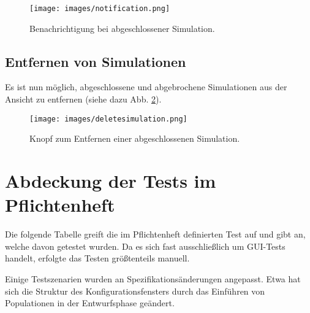 \documentclass[parskip=full,11pt,openany]{scrreprt}
\begin{document}
\begin{figure}
	\centering
	\texttt{[image: images/notification.png]}
	\caption{Benachrichtigung bei abgeschlossener Simulation.}
	\label{notification}
\end{figure}

\subsection{Entfernen von Simulationen}
Es ist nun möglich, abgeschlossene und abgebrochene Simulationen aus der Ansicht zu entfernen (siehe dazu Abb. \ref{deletesimulation}).

\begin{figure}
	\centering
	\texttt{[image: images/deletesimulation.png]}
	\caption{Knopf zum Entfernen einer abgeschlossenen Simulation.}
	\label{deletesimulation}
\end{figure}

\section{Abdeckung der Tests im Pflichtenheft}

Die folgende Tabelle greift die im Pflichtenheft definierten Test auf und gibt an, welche davon getestet wurden. Da es sich fast ausschließlich um GUI-Tests handelt, erfolgte das Testen größtenteils manuell.

Einige Testszenarien wurden an Spezifikationsänderungen angepasst. Etwa hat sich die Struktur des Konfigurationsfensters durch das Einführen von Populationen in der Entwurfsphase geändert.
\end{document}
